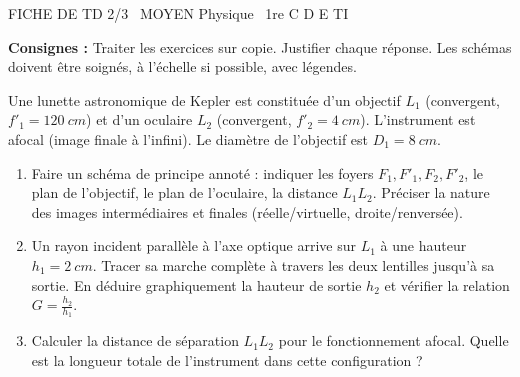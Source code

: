 \documentclass[11pt]{article}
\begin{document}
\begin{tcolorbox}[enhanced,colback=popink,colframe=popink,arc=10pt,boxrule=0pt,left=12pt,right=12pt,top=9pt,bottom=9pt]
{\color{white}\popxbold\small FICHE DE TD 2/3 \textbullet\ MOYEN \hfill Physique \textbullet\ 1re C D E TI\par}
\end{tcolorbox}
\vspace{4pt}
\noindent \textbf{Consignes :} Traiter les exercices sur copie. Justifier chaque réponse. Les schémas doivent être soignés, à l'échelle si possible, avec légendes.

\begin{exercice}
Une lunette astronomique de Kepler est constituée d'un objectif $L_1$ (convergent, $f'_1 = \SI{120}{cm}$) et d'un oculaire $L_2$ (convergent, $f'_2 = \SI{4}{cm}$). L'instrument est afocal (image finale à l'infini). Le diamètre de l'objectif est $D_1 = \SI{8}{cm}$.
\begin{enumerate}
    \item Faire un schéma de principe annoté : indiquer les foyers $F_1, F'_1, F_2, F'_2$, le plan de l'objectif, le plan de l'oculaire, la distance $L_1L_2$. Préciser la nature des images intermédiaires et finales (réelle/virtuelle, droite/renversée).
    \item Un rayon incident parallèle à l'axe optique arrive sur $L_1$ à une hauteur $h_1 = \SI{2}{cm}$. Tracer sa marche complète à travers les deux lentilles jusqu'à sa sortie. En déduire graphiquement la hauteur de sortie $h_2$ et vérifier la relation $G = \frac{h_2}{h_1}$.
    \item Calculer la distance de séparation $L_1L_2$ pour le fonctionnement afocal. Quelle est la longueur totale de l'instrument dans cette configuration ?
\end{enumerate}
\end{exercice}
\end{document}
